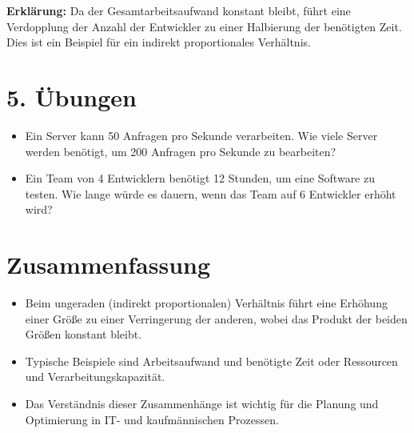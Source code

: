\documentclass{orgstandard}
\begin{document}
\textbf{\textbf{Erklärung:}}
Da der Gesamtarbeitsaufwand konstant bleibt, führt eine Verdopplung der Anzahl der Entwickler zu einer Halbierung der benötigten Zeit. Dies ist ein Beispiel für ein indirekt proportionales Verhältnis.
\section{5. Übungen}
\label{sec:orge1c81f6}
\begin{itemize}
\item Ein Server kann 50 Anfragen pro Sekunde verarbeiten. Wie viele Server werden benötigt, um 200 Anfragen pro Sekunde zu bearbeiten?
\item Ein Team von 4 Entwicklern benötigt 12 Stunden, um eine Software zu testen. Wie lange würde es dauern, wenn das Team auf 6 Entwickler erhöht wird?
\end{itemize}
\section{Zusammenfassung}
\label{sec:orgd584a9e}
\begin{itemize}
\item Beim ungeraden (indirekt proportionalen) Verhältnis führt eine Erhöhung einer Größe zu einer Verringerung der anderen, wobei das Produkt der beiden Größen konstant bleibt.
\item Typische Beispiele sind Arbeitsaufwand und benötigte Zeit oder Ressourcen und Verarbeitungskapazität.
\item Das Verständnis dieser Zusammenhänge ist wichtig für die Planung und Optimierung in IT- und kaufmännischen Prozessen.
\end{itemize}
\end{document}
